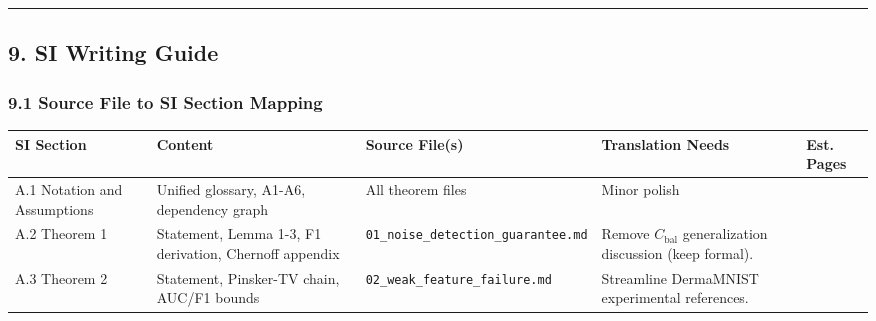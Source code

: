 \documentclass[
  12pt,
]{ctexart}
\begin{document}
\begin{center}\rule{0.5\linewidth}{0.5pt}\end{center}

\subsection{9. SI Writing Guide}\label{si-writing-guide}

\subsubsection{9.1 Source File to SI Section
Mapping}\label{source-file-to-si-section-mapping}

\begin{longtable}[]{@{}
  >{\raggedright\arraybackslash}p{}
  >{\raggedright\arraybackslash}p{}
  >{\raggedright\arraybackslash}p{}
  >{\raggedright\arraybackslash}p{}
  >{\raggedright\arraybackslash}p{}@{}}
\toprule\noalign{}
\begin{minipage}[b]{\linewidth}\raggedright
SI Section
\end{minipage} & \begin{minipage}[b]{\linewidth}\raggedright
Content
\end{minipage} & \begin{minipage}[b]{\linewidth}\raggedright
Source File(s)
\end{minipage} & \begin{minipage}[b]{\linewidth}\raggedright
Translation Needs
\end{minipage} & \begin{minipage}[b]{\linewidth}\raggedright
Est. Pages
\end{minipage} \\
\midrule\noalign{}
\endhead
\bottomrule\noalign{}
\endlastfoot
A.1 Notation and Assumptions & Unified glossary, A1-A6, dependency graph
& All theorem files & Minor polish & 2 \\
A.2 Theorem 1 & Statement, Lemma 1-3, F1 derivation, Chernoff appendix &
\texttt{01\_noise\_detection\_guarantee.md} & Remove \(C_{\text{bal}}\)
generalization discussion (keep formal). & 6 \\
A.3 Theorem 2 & Statement, Pinsker-TV chain, AUC/F1 bounds &
\texttt{02\_weak\_feature\_failure.md} & Streamline DermaMNIST
experimental references. & 5 \\

\end{longtable}
\end{document}
